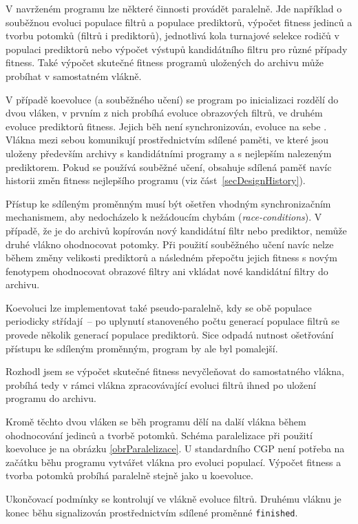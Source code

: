 V navrženém programu lze některé činnosti provádět paralelně. Jde například o souběžnou evoluci populace filtrů a populace prediktorů, výpočet fitness jedinců a tvorbu potomků (filtrů i prediktorů), jednotlivá kola turnajové selekce rodičů v populaci prediktorů nebo výpočet výstupů kandidátního filtru pro různé případy fitness. Také výpočet skutečné fitness programů uložených do archivu může probíhat v samostatném vlákně.

V případě koevoluce (a souběžného učení) se program po inicializaci rozdělí do dvou vláken, v prvním z nich probíhá evoluce obrazových filtrů, ve druhém evoluce prediktorů fitness. Jejich běh není synchronizován, evoluce na sebe . Vlákna mezi sebou komunikují prostřednictvím sdílené paměti, ve které jsou uloženy především archivy s kandidátními programy a s nejlepším nalezeným prediktorem. Pokud se používá souběžné učení, obsahuje sdílená paměť navíc historii změn fitness nejlepšího programu (viz část~\ref{secDesignHistory}).

Přístup ke sdíleným proměnným musí být ošetřen vhodným synchronizačním mechanismem, aby nedocházelo k nežádoucím chybám (\emph{race-conditions}). V případě, že je do archivů kopírován nový kandidátní filtr nebo prediktor, nemůže druhé vlákno ohodnocovat potomky. Při použití souběžného učení navíc nelze během změny velikosti prediktorů a následném přepočtu jejich fitness s novým fenotypem ohodnocovat obrazové filtry ani vkládat nové kandidátní filtry do archivu.

Koevoluci lze implementovat také pseudo-paralelně, kdy se obě populace periodicky střídají~-- po uplynutí stanoveného počtu generací populace filtrů se provede několik generací populace prediktorů. Sice odpadá nutnost ošetřování přístupu ke sdíleným proměnným, program by ale byl pomalejší.

Rozhodl jsem se výpočet skutečné fitness nevyčleňovat do samostatného vlákna, probíhá tedy v rámci vlákna zpracovávající evoluci filtrů ihned po uložení programu do archivu.

Kromě těchto dvou vláken se běh programu dělí na další vlákna během ohodnocování jedinců a tvorbě potomků. Schéma paralelizace při použití koevoluce je na obrázku \ref{obrParalelizace}. U standardního CGP není potřeba na začátku běhu programu vytvářet vlákna pro evoluci populací. Výpočet fitness a tvorba potomků probíhá paralelně stejně jako u koevoluce.

Ukončovací podmínky se kontrolují ve vlákně evoluce filtrů. Druhému vláknu je konec běhu signalizován prostřednictvím sdílené proměnné \texttt{finished}.

